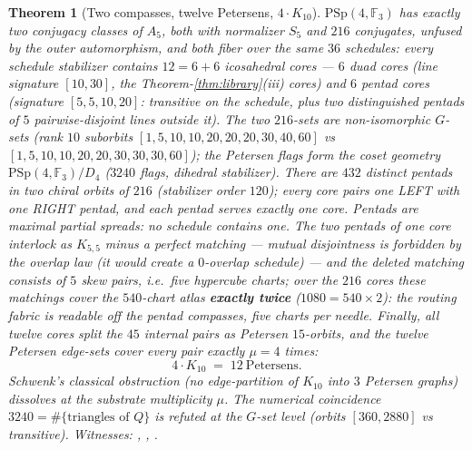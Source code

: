 \documentclass[11pt]{article}
\newtheorem{theorem}{Theorem}[section]
\newcommand{\GF}[1]{\mathbb{F}_{#1}}
\newcommand{\PSp}{\mathrm{PSp}}
\begin{document}
\begin{theorem}[Two compasses, twelve Petersens, $4\cdot K_{10}$]
$\PSp(4,\GF3)$ has exactly two conjugacy classes of $A_5$, both with
normalizer $S_5$ and $216$ conjugates, unfused by the outer
automorphism, and \emph{both fiber over the same $36$ schedules}:
every schedule stabilizer contains $12=6+6$ icosahedral cores ---
$6$ \emph{duad} cores (line signature $[10,30]$, the
Theorem-\ref{thm:library}(iii) cores) and $6$ \emph{pentad} cores
(signature $[5,5,10,20]$: transitive on the schedule, plus two
distinguished \emph{pentads} of $5$ pairwise-disjoint lines outside
it).  The two $216$-sets are non-isomorphic $G$-sets (rank $10$
suborbits $[1,5,10,10,20,20,20,30,40,60]$ vs
$[1,5,10,10,20,20,30,30,30,60]$); the Petersen flags form the coset
geometry $\PSp(4,\GF3)/D_4$ ($3240$ flags, dihedral stabilizer).
There are $432$ distinct pentads in \emph{two chiral orbits} of
$216$ (stabilizer order $120$); every core pairs one LEFT with one
RIGHT pentad, and each pentad serves exactly one core.  Pentads are
\emph{maximal partial spreads}: no schedule contains one.  The two
pentads of one core interlock as $K_{5,5}$ minus a perfect matching
--- mutual disjointness is \emph{forbidden} by the overlap law (it
would create a $0$-overlap schedule) --- and the deleted matching
consists of $5$ \emph{skew} pairs, i.e.\ five hypercube charts; over
the $216$ cores these matchings cover the $540$-chart atlas
\textbf{exactly twice} ($1080=540\times2$): the routing fabric is
readable off the pentad compasses, five charts per needle.  Finally,
\emph{all twelve} cores split the $45$ internal pairs as Petersen
$15$-orbits, and the twelve Petersen edge-sets cover every pair
exactly $\mu=4$ times:
\[
4\cdot K_{10} \;=\; 12\ \text{Petersens}.
\]
Schwenk's classical obstruction (no edge-partition of $K_{10}$ into
$3$ Petersen graphs) dissolves at the substrate multiplicity $\mu$.
The numerical coincidence $3240=\#\{\text{triangles of }Q\}$ is
refuted at the $G$-set level (orbits $[360,2880]$ vs transitive).
\emph{Witnesses: ,
,
.}
\end{theorem}
\end{document}
